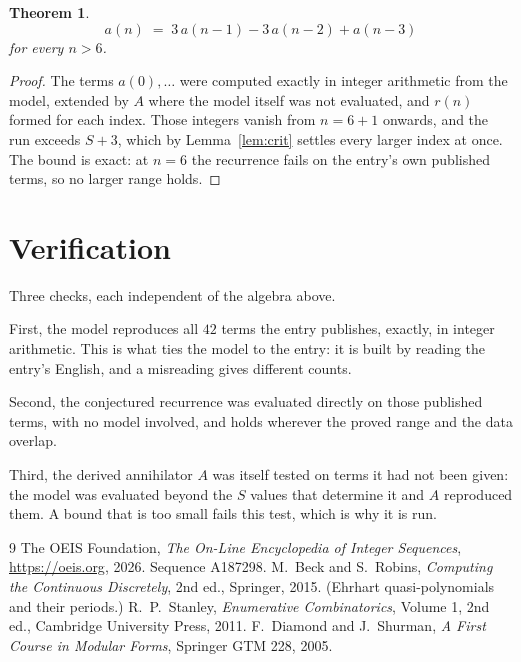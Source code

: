 \documentclass[11pt,a4paper]{article}
\theoremstyle{plain}
\newtheorem{theorem}{Theorem}
\theoremstyle{definition}
\begin{document}
\begin{theorem}
\[
a(n)\;=\;3\,a(n-1) - 3\,a(n-2) + a(n-3)
\]
for every $n>6$.
\end{theorem}

\begin{proof}
The terms $a(0),\dots$ were computed exactly in integer arithmetic from the model, extended by
$A$ where the model itself was not evaluated, and $r(n)$ formed for each index. Those integers
vanish from $n=6+1$ onwards, and the run exceeds $S+3$, which by
Lemma~\ref{lem:crit} settles every larger index at once. The bound is exact: at $n=6$ the recurrence fails on the entry's own published terms, so no larger range holds.
\end{proof}

\section{Verification}

Three checks, each independent of the algebra above.

First, the model reproduces all $42$ terms the entry publishes, exactly, in integer
arithmetic. This is what ties the model to the entry: it is built by reading the entry's
English, and a misreading gives different counts.

Second, the conjectured recurrence was evaluated directly on those published terms, with no
model involved, and holds wherever the proved range and the data overlap.

Third, the derived annihilator $A$ was itself tested on terms it had not been given: the model
was evaluated beyond the $S$ values that determine it and $A$ reproduced them. A bound that is
too small fails this test, which is why it is run.

\begin{thebibliography}{9}
 The OEIS Foundation, \emph{The On-Line Encyclopedia of Integer
Sequences}, \url{https://oeis.org}, 2026. Sequence A187298.
 M.~Beck and S.~Robins, \emph{Computing the Continuous Discretely},
2nd ed., Springer, 2015. (Ehrhart quasi-polynomials and their periods.)
 R.~P.~Stanley, \emph{Enumerative Combinatorics}, Volume 1, 2nd ed.,
Cambridge University Press, 2011.
 F.~Diamond and J.~Shurman, \emph{A First Course in Modular Forms},
Springer GTM 228, 2005.
\end{thebibliography}
\end{document}
